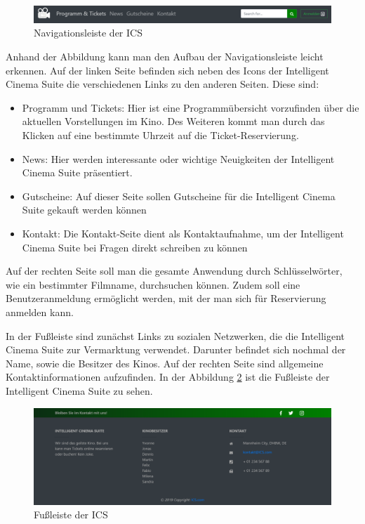 	\begin{figure}[H]
	    	    			\centering 
	    	    			\includegraphics[width=14cm]{img/NavBar.png}
	    	    			\captionsetup{format=hang}
	    	    			\caption[Navigationsleiste der ICS]{\label{fig:Navigationsleiste} Navigationsleiste der \ac{ICS}} 
	   \end{figure}
	    
	    
	    Anhand der Abbildung kann man den Aufbau der Navigationsleiste leicht erkennen. Auf der linken Seite befinden sich neben des Icons der Intelligent Cinema Suite die verschiedenen Links zu den anderen Seiten. Diese sind: 
	    \begin{itemize}
	        \setlength\itemsep{-0.8em}
	        \item Programm und Tickets: Hier ist eine Programmübersicht vorzufinden über die aktuellen Vorstellungen im Kino. Des Weiteren kommt man durch das Klicken auf eine bestimmte Uhrzeit auf die Ticket-Reservierung.
	        \item News: Hier werden interessante oder wichtige Neuigkeiten der Intelligent Cinema Suite präsentiert. 
	        \item Gutscheine: Auf dieser Seite sollen Gutscheine für die Intelligent Cinema Suite gekauft werden können
	        \item Kontakt: Die Kontakt-Seite dient als Kontaktaufnahme, um der Intelligent Cinema Suite bei Fragen direkt schreiben zu können 
	    \end{itemize}
	    
	    Auf der rechten Seite soll man die gesamte Anwendung durch Schlüsselwörter, wie ein bestimmter Filmname, durchsuchen können. Zudem soll eine Benutzeranmeldung ermöglicht werden, mit der man sich für Reservierung anmelden kann.

	    In der Fußleiste sind zunächst Links zu sozialen Netzwerken, die die Intelligent Cinema Suite zur Vermarktung verwendet. Darunter befindet sich nochmal der Name,  sowie die Besitzer des Kinos. Auf der rechten Seite sind allgemeine Kontaktinformationen aufzufinden. In der Abbildung \ref{fig:Footer} ist die Fußleiste der Intelligent Cinema Suite zu sehen.
 		\begin{figure}[H]
	    	    			\centering 
	    	    			\includegraphics[width=14cm]{img/Footer.png}
	    	    			\captionsetup{format=hang}
	    	    			\caption[Fußleiste der ICS]{\label{fig:Footer} Fußleiste der \ac{ICS}} 
  	    \end{figure}

